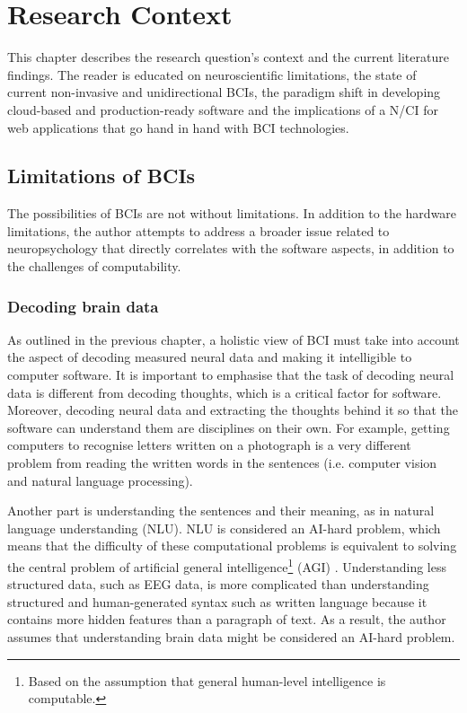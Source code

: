\chapter{Research Context}
\graphicspath{{Chapter2/Figs/}{Chapter2/Figs/}}

This chapter describes the research question's context and the current literature findings. The reader is educated on neuroscientific limitations, the state of current non-invasive and unidirectional BCIs, the paradigm shift in developing cloud-based and production-ready software and the implications of a N/CI for web applications that go hand in hand with BCI technologies.

\section{Limitations of BCIs}
\label{chapter2-limitations-of-bcis}

The possibilities of BCIs are not without limitations. In addition to the hardware limitations, the author attempts to address a broader issue related to neuropsychology that directly correlates with the software aspects, in addition to the challenges of computability.

\subsection{Decoding brain data}
\label{chapter2-decoding-brain-data}

As outlined in the previous chapter, a holistic view of BCI must take into account the aspect of decoding measured neural data and making it intelligible to computer software. It is important to emphasise that the task of decoding neural data is different from decoding thoughts, which is a critical factor for software. Moreover, decoding neural data and extracting the thoughts behind it so that the software can understand them are disciplines on their own. For example, getting computers to recognise letters written on a photograph is a very different problem from reading the written words in the sentences (i.e. computer vision and natural language processing).

Another part is understanding the sentences and their meaning, as in natural language understanding (NLU). NLU is considered an AI-hard problem, which means that the difficulty of these computational problems is equivalent to solving the central problem of artificial general intelligence\footnote{Based on the assumption that general human-level intelligence is computable.} (AGI) \citep{demasi_theoretical_2010}. Understanding less structured data, such as EEG data, is more complicated than understanding structured and human-generated syntax such as written language because it contains more hidden features than a paragraph of text. As a result, the author assumes that understanding brain data might be considered an AI-hard problem.

